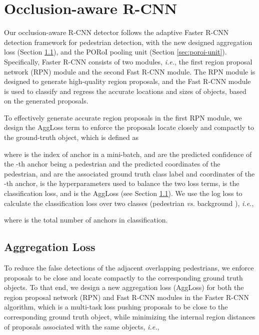 \documentclass[runningheads]{llncs}
\def\ie{{\em i.e.}}
\begin{document}
\section{Occlusion-aware R-CNN}
Our occlusion-aware R-CNN detector follows the adaptive Faster R-CNN detection framework \cite{DBLP:conf/cvpr/ZhangBS17} for pedestrian detection, with the new designed aggregation loss (Section \ref{sec:aggregation-loss}), and the PORoI pooling unit (Section \ref{sec:poroi-unit}). Specifically, Faster R-CNN \cite{DBLP:journals/pami/RenHG017} consists of two modules, \ie, the first region proposal network (RPN) module and the second Fast R-CNN module. The RPN module is designed to generate high-quality region proposals, and the Fast R-CNN module is used to classify and regress the accurate locations and sizes of objects, based on the generated proposals.

To effectively generate accurate region proposals in the first RPN module, we design the AggLoss term to enforce the proposals locate closely and compactly to the ground-truth object, which is defined as

where  is the index of anchor in a mini-batch,  and  are the predicted confidence of the -th anchor being a pedestrian and the predicted coordinates of the pedestrian,  and  are the associated ground truth class label and coordinates of the -th anchor,  is the hyperparameters used to balance the two loss terms,  is the classification loss, and  is the AggLoss (see Section \ref{sec:aggregation-loss}). We use the log loss to calculate the classification loss over two classes (pedestrian  {\em vs.} background ), \ie,

where  is the total number of anchors in classification.

\subsection{Aggregation Loss}
\label{sec:aggregation-loss}
To reduce the false detections of the adjacent overlapping pedestrians, we enforce proposals to be close and locate compactly to the corresponding ground truth objects. To that end, we design a new aggregation loss (AggLoss) for both the region proposal network (RPN) and Fast R-CNN \cite{DBLP:conf/iccv/Girshick15} modules in the Faster R-CNN algorithm, which is a multi-task loss pushing proposals to be
close to the corresponding ground truth object, while minimizing the internal region distances of proposals associated with the same objects, \ie,
\end{document}
